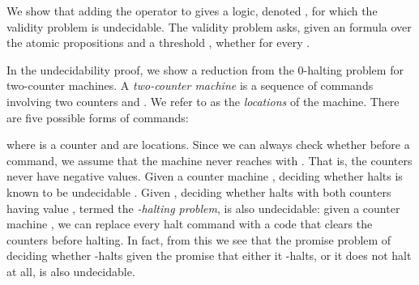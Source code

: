 \documentclass{llncs}
\begin{document}
\newcommand{\inc}{\mbox{\sc inc}\xspace}
\newcommand{\dec}{\mbox{\sc dec}\xspace}
\newcommand{\goto}{\mbox{\sc goto }}
\newcommand{\halt}{\mbox{\sc halt}\xspace}
\newcommand{\jz}[3]{\mbox{\sc if =0 goto  else goto }\xspace}
\newcommand{\CMrun}{\rho}
\newcommand{\comcheck}{\mbox{\rm ComCheck}\xspace}

We show that adding the  operator to  gives a logic, denoted , for which the validity problem is undecidable.
The validity problem asks, given an  formula  over the atomic propositions  and a threshold , whether  for every .

In the undecidability proof, we show a reduction from the 0-halting problem for two-counter machines.
A {\em two-counter machine}  is a sequence  of commands involving two counters  and . We refer to
 as the {\em locations} of the machine. There are five possible forms of commands:

where  is a counter and  are locations. Since we can always check whether  before a  command, we
assume that the machine never reaches  with . That is, the counters never have negative values. Given a counter machine ,
deciding whether  halts is known to be undecidable \cite{Min67}. Given , deciding whether  halts with both counters having value
, termed the {\em -halting problem}, is also undecidable: given a counter machine , we can replace every \halt command with a code that clears the counters before
halting. 
In fact, from this we see that the promise problem of deciding whether  -halts given the promise that either it -halts, or it does not halt at all, is also undecidable.
\end{document}
